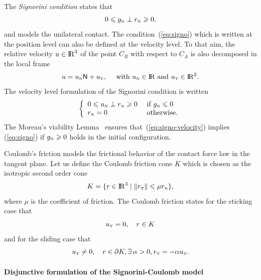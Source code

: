 The \textit{Signorini condition} states that
\begin{equation}
  \label{eq:signo}
  0 \leq g_{\n} \perp r_\n \geq 0.
\end{equation}
 and models the unilateral contact. The condition~(\ref{eq:signo}) which is written at the position level can also be defined at the velocity level. To that aim, the relative velocity $u \in \mathrm{I\!R}^3$ of the point $C_{B}$ with respect to $C_{A}$ is also decomposed in the local frame
\begin{equation}
  \label{eq:velocity}
  u =  u_\n {\sf N} + u_\t, \quad \text{ with } u_\n \in \RR \text{ and } u_\t \in \RR^2.
\end{equation}
The velocity level formulation of the Signorini condition is written 
\begin{equation}
  \label{eq:signo-velocity}
  \left\{\begin{array}{ll}
  0 \leq u_{\n} \perp r_\n \geq 0  &\text{ if } g_{\n} \leq 0 \\
  r_{\n} =0 &\text{ otherwise}.
\end{array}\right.
\end{equation}
The Moreau's viability Lemma~\cite{Moreau1988} ensures that~(\ref{eq:signo-velocity}) implies (\ref{eq:signo}) if $g_{{\hbox{\tiny{N}}}}\geqslant 0$ holds in the initial configuration.

Coulomb's friction  models the frictional behavior of the contact force law in the tangent plane. Let us define the Coulomb friction  cone $K$ which is chosen as the isotropic second order cone 
\begin{equation}
  \label{eq:CoulombCone}
  K = \{r \in \RR^3 \mid \|r_\t\| \leq \mu r_n\},
\end{equation}
where $\mu$ is the coefficient of friction. The Coulomb friction  states for the sticking case that 
\begin{equation}
  \label{eq:Coulom-stick}
  u_{\t} =0,\quad r \in K
\end{equation}
and for the sliding case that
\begin{equation}
  \label{eq:Coulom-slide}
  u_{\t}  \neq 0,\quad r \in \partial K, \exists\, \alpha > 0, r_\t = -\alpha u_\t.
\end{equation}

\paragraph{Disjunctive formulation of the Signorini-Coulomb model}

